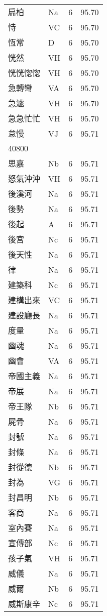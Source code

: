 \documentclass[twocolumn]{book}
\begin{document}
\begin{supertabular}{llrr}
扁柏 & Na & 6 &  95.70\\
恃 & VC & 6 &  95.70\\
恆常 & D & 6 &  95.70\\
恍然 & VH & 6 &  95.70\\
恍恍惚惚 & VH & 6 &  95.70\\
急轉彎 & VA & 6 &  95.70\\
急遽 & VH & 6 &  95.70\\
急急忙忙 & VH & 6 &  95.70\\
怠慢 & VJ & 6 &  95.71\\
40800\\
思嘉 & Nb & 6 &  95.71\\
怒氣沖沖 & VH & 6 &  95.71\\
後溪河 & Na & 6 &  95.71\\
後勢 & Na & 6 &  95.71\\
後起 & A & 6 &  95.71\\
後宮 & Nc & 6 &  95.71\\
後天性 & Na & 6 &  95.71\\
律 & Na & 6 &  95.71\\
建築科 & Nc & 6 &  95.71\\
建構出來 & VC & 6 &  95.71\\
建設廳長 & Na & 6 &  95.71\\
度量 & Na & 6 &  95.71\\
幽魂 & Na & 6 &  95.71\\
幽會 & VA & 6 &  95.71\\
帝國主義 & Na & 6 &  95.71\\
帝展 & Na & 6 &  95.71\\
帝王隊 & Nb & 6 &  95.71\\
屍骨 & Na & 6 &  95.71\\
封號 & Na & 6 &  95.71\\
封條 & Na & 6 &  95.71\\
封從德 & Nb & 6 &  95.71\\
封為 & VG & 6 &  95.71\\
封昌明 & Nb & 6 &  95.71\\
客商 & Na & 6 &  95.71\\
室內賽 & Na & 6 &  95.71\\
宣傳部 & Nc & 6 &  95.71\\
孩子氣 & VH & 6 &  95.71\\
威儀 & Na & 6 &  95.71\\
威爾 & Nb & 6 &  95.71\\
威斯康辛 & Nc & 6 &  95.71\\

\end{supertabular}
\end{document}
